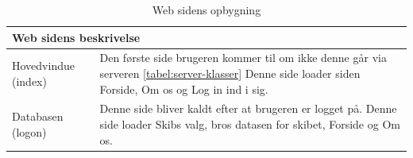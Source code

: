 \begin{table}[H]
\centering
\begin{tabular}{p{3cm} p{12.5cm}}
\multicolumn{2}{l}{{\Large Web sidens beskrivelse}} \\\hline
Hovedvindue (index) & Den første side brugeren kommer til om ikke denne går via serveren \ref{tabel:server-klasser} Denne side loader siden Forside, Om os og Log in ind i sig.\\
Databasen (logon) & Denne side bliver kaldt efter at brugeren er logget på. Denne side loader Skibs valg, bros datasen for skibet, Forside og Om os. 
\end{tabular}
\caption{Web sidens opbygning}
\label{tabel:webside-simpel}
\end{table}